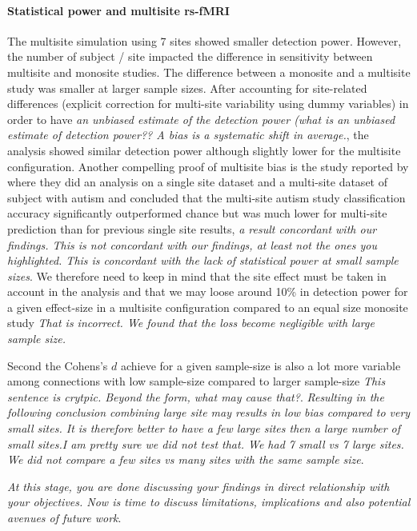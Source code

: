 \documentclass[authoryear]{elsarticle}
\begin{document}
\paragraph{Statistical power and multisite rs-fMRI} The multisite simulation using 7 sites showed smaller detection power. However, the number of subject / site impacted the difference in sensitivity between multisite and monosite studies. The difference between a monosite and a multisite study was smaller at larger sample sizes. After accounting for site-related differences (explicit correction for multi-site variability using dummy variables) in order to have \emph{an unbiased estimate of the detection power (what is an unbiased estimate of detection power?? A bias is a systematic shift in average.}, the analysis showed similar detection power although slightly lower for the multisite configuration. Another compelling proof of multisite bias is the study reported by \cite{Nielsen2013} where they did an analysis on a single site dataset and a multi-site dataset of subject with autism and concluded that the multi-site autism study classification accuracy significantly outperformed chance but was much lower for multi-site prediction than for previous single site results, \emph{a result concordant with our findings. This is not concordant with our findings, at least not the ones you highlighted. This is concordant with the lack of statistical power at small sample sizes}. We therefore need to keep in mind that the site effect must be taken in account in the analysis and that we may loose around 10\% in detection power for a given effect-size in a multisite configuration compared to an equal size monosite study \emph{That is incorrect. We found that the loss become negligible with large sample size.}\\
\par
Second the Cohens's $d$ achieve for a given sample-size is also a lot more variable among connections with low sample-size compared to larger sample-size \emph{This sentence is crytpic. Beyond the form, what may cause that?}. \emph{Resulting in the following conclusion combining large site may results in low bias compared to very small sites. It is therefore better to have a few large sites then a large number of small sites.I am pretty sure we did not test that. We had 7 small vs 7 large sites. We did not compare a few sites vs many sites with the same sample size}. 
\par
\emph{At this stage, you are done discussing your findings in direct relationship with your objectives. Now is time to discuss limitations, implications and also potential avenues of future work}. 
\end{document}
